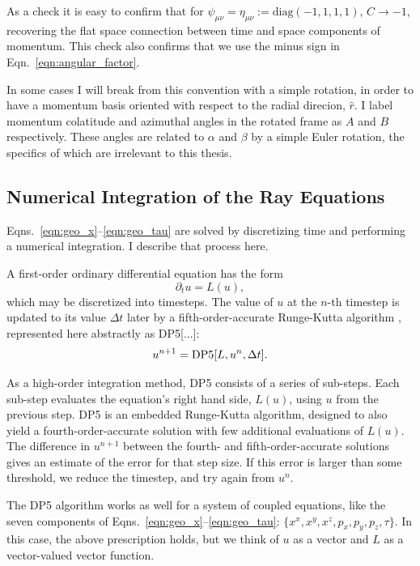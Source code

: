 As a check it is easy to confirm that for
$\psi_{\mu \nu}=\eta_{\mu \nu}:=\text{diag}(-1,1,1,1)$,
$C \rightarrow -1$, recovering the flat space connection between time and space
components of momentum. This check also confirms that we use the minus sign in
Eqn.~\ref{eqn:angular_factor}.

In some cases I will break from this convention with a simple rotation, in order
to have a momentum basis oriented with respect to the radial direcion, $\hat{r}$.
I label momentum colatitude and azimuthal angles in the rotated frame as $A$
and $B$ respectively. These angles are related to $\alpha$ and $\beta$ by a
simple Euler rotation, the specifics of which are irrelevant to this thesis.

\subsection{Numerical Integration of the Ray Equations}
\label{ssec:timestepping}
Eqns.~\ref{eqn:geo_x}--\ref{eqn:geo_tau} are solved by discretizing time and
performing a numerical integration.
I describe that process here.

A first-order ordinary differential equation has the form
\begin{equation}
  \partial_t u = L(u),
\end{equation}
which may be discretized into timesteps.
The value of $u$ at the $n$-th timestep is updated to its value
$\Delta t$ later by a fifth-order-accurate Runge-Kutta algorithm
\citep{dorm1978-runge_kutta},
represented here abstractly as DP5[...]:
\begin{equation}
  u^{n+1} = {\rm DP5}[L,u^n,\Delta t].
\end{equation}

As a high-order integration method, DP5 consists of a series of sub-steps.
Each sub-step evaluates the equation's right hand side, $L(u)$, using $u$ from
the previous step.
DP5 is an embedded Runge-Kutta algorithm, designed to also yield
a fourth-order-accurate solution with few additional evaluations of $L(u)$.
The difference in $u^{n+1}$ between the fourth- and fifth-order-accurate
solutions gives an estimate of the error for that step size. If this error is
larger than some threshold, we reduce the timestep, and try again from $u^n$.

The DP5 algorithm works as well for a system of coupled equations,
like the seven components of Eqns.~\ref{eqn:geo_x}--\ref{eqn:geo_tau}:
$\{x^x,x^y,x^z,p_x,p_y,p_z,\tau\}$.
In this case, the above prescription holds, but we think of $u$ as a
vector and $L$ as a vector-valued vector function.

